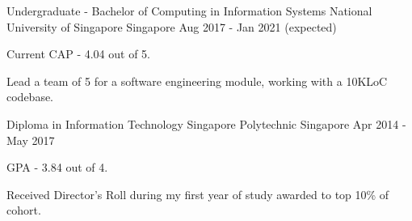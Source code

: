 

\begin{cventries}

  \cventry
    {Undergraduate - Bachelor of Computing in Information Systems} %
    {National University of Singapore} %
    {Singapore} %
    {Aug 2017 - Jan 2021 (expected)} %
    {
      \begin{cvitems} %
        \item {Current CAP - 4.04 out of 5.}
        \item {Lead a team of 5 for a software engineering module, working with a 10KLoC codebase.}
      \end{cvitems}
    }

  \cventry
    {Diploma in Information Technology} %
    {Singapore Polytechnic} %
    {Singapore} %
    {Apr 2014 - May 2017} %
    {
      \begin{cvitems} %
        \item {GPA - 3.84 out of 4.}
        \item {Received Director's Roll during my first year of study awarded to top 10\% of cohort.}
      \end{cvitems}
    }

\end{cventries}
